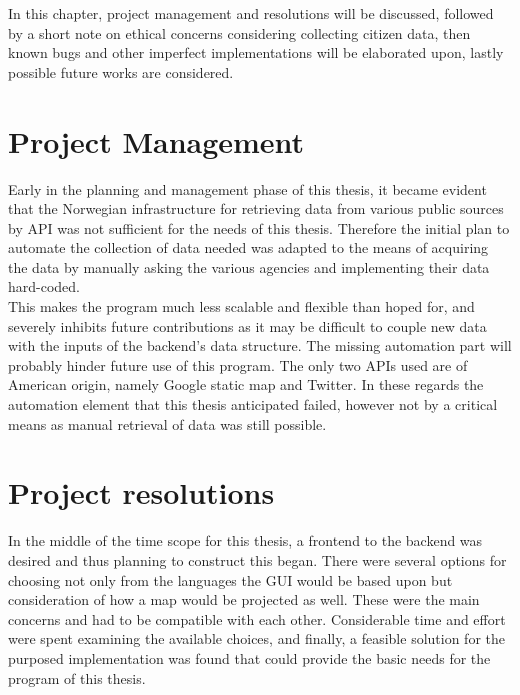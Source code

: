 In this chapter, project management and resolutions will be discussed, followed by a short note on ethical concerns considering collecting citizen data, then known bugs and other imperfect implementations will be elaborated upon, lastly possible future works are considered.

\section{Project Management}

Early in the planning and management phase of this thesis, it became evident that the Norwegian infrastructure for retrieving data from various public sources by API was not sufficient for the needs of this thesis. Therefore the initial plan to automate the collection of data needed was adapted to the means of acquiring the data by manually asking the various agencies and implementing their data hard-coded.
\\
This makes the program much less scalable and flexible than hoped for, and severely inhibits future contributions as it may be difficult to couple new data with the inputs of the backend's data structure. The missing automation part will probably hinder future use of this program. The only two APIs used are of American origin, namely Google static map and Twitter. In these regards the automation element that this thesis anticipated failed, however not by a critical means as manual retrieval of data was still possible.






\section{Project resolutions}
In the middle of the time scope for this thesis, a frontend to the backend was desired and thus planning to construct this began. There were several options for choosing not only from the languages the GUI would be based upon but consideration of how a map would be projected as well. These were the main concerns and had to be compatible with each other. Considerable time and effort were spent examining the available choices, and finally, a feasible solution for the purposed implementation was found that could provide the basic needs for the program of this thesis.

